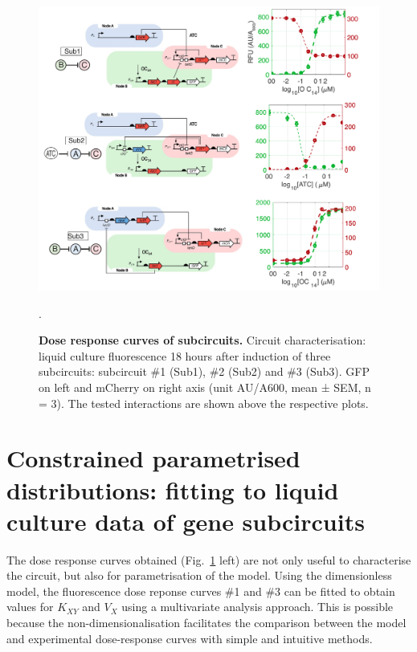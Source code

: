 \begin{figure}[H] %
    \centering
    \begin{adjustbox}{center}
        \includegraphics[width=1\textwidth]{chapters/Chapter 2/dose_response_experimental} %
    \end{adjustbox}
    \caption{\textbf{Dose response curves of subcircuits.} Circuit characterisation: liquid culture fluorescence 18 hours after induction of three subcircuits: subcircuit \#1 (Sub1), \#2 (Sub2) and \#3 (Sub3). GFP on left and mCherry on right axis (unit AU/A600, mean ± SEM, n = 3). The tested interactions are shown above the respective plots.}.
    \label{fig:dose_response_experimental} %
\end{figure}
\section{Constrained parametrised distributions: fitting to liquid culture data of gene subcircuits}
The dose response curves obtained (Fig.~\ref{fig:dose_response_experimental} left) are not only useful to characterise the circuit, but also for parametrisation of the model.
Using the dimensionless model, the fluorescence dose reponse curves \#1 and \#3 can be fitted to obtain values for $K_{XY}$ and $V_{X}$ using a multivariate analysis approach.
This is possible because the non-dimensionalisation facilitates the comparison between the model and experimental dose-response curves with simple and intuitive methods.


